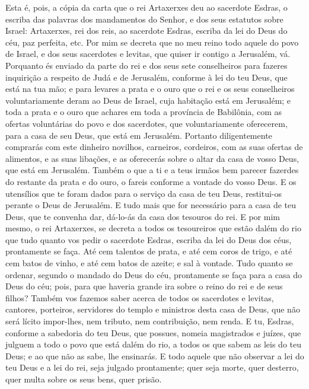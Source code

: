 Esta é, pois, a cópia da carta que o rei Artaxerxes deu ao
sacerdote Esdras, o escriba das palavras dos mandamentos do Senhor,
e dos seus estatutos sobre Israel: Artaxerxes, rei dos reis,
ao sacerdote Esdras, escriba da lei do Deus do céu, paz perfeita,
etc. Por mim se decreta que no meu reino todo aquele do povo
de Israel, e dos seus sacerdotes e levitas, que quiser ir contigo a
Jerusalém, vá. Porquanto és enviado da parte do rei e dos
seus sete conselheiros para fazeres inquirição a respeito de Judá e
de Jerusalém, conforme à lei do teu Deus, que está na tua mão;
e para levares a prata e o ouro que o rei e os seus
conselheiros voluntariamente deram ao Deus de Israel, cuja habitação
está em Jerusalém; e toda a prata e o ouro que achares em
toda a província de Babilônia, com as ofertas voluntárias do povo e
dos sacerdotes, que voluntariamente oferecerem, para a casa de seu
Deus, que está em Jerusalém. Portanto diligentemente
comprarás com este dinheiro novilhos, carneiros, cordeiros, com as
suas ofertas de alimentos, e as suas libações, e as oferecerás sobre
o altar da casa de vosso Deus, que está em Jerusalém. Também
o que a ti e a teus irmãos bem parecer fazerdes do restante da prata
e do ouro, o fareis conforme a vontade do vosso Deus. E os
utensílios que te foram dados para o serviço da casa de teu Deus,
restitui-os perante o Deus de Jerusalém. E tudo mais que for
necessário para a casa de teu Deus, que te convenha dar, dá-lo-ás da
casa dos tesouros do rei. E por mim mesmo, o rei Artaxerxes,
se decreta a todos os tesoureiros que estão dalém do rio que tudo
quanto vos pedir o sacerdote Esdras, escriba da lei do Deus dos
céus, prontamente se faça. Até cem talentos de prata, e até
cem coros de trigo, e até cem batos de vinho, e até cem batos de
azeite; e sal à vontade. Tudo quanto se ordenar, segundo o
mandado do Deus do céu, prontamente se faça para a casa do Deus do
céu; pois, para que haveria grande ira sobre o reino do rei e de
seus filhos? Também vos fazemos saber acerca de todos os
sacerdotes e levitas, cantores, porteiros, servidores do templo e
ministros desta casa de Deus, que não será lícito impor-lhes, nem
tributo, nem contribuição, nem renda. E tu, Esdras, conforme
a sabedoria do teu Deus, que possues, nomeia magistrados e juízes,
que julguem a todo o povo que está dalém do rio, a todos os que
sabem as leis do teu Deus; e ao que não as sabe, lhe ensinarás.
E todo aquele que não observar a lei do teu Deus e a lei do
rei, seja julgado prontamente; quer seja morte, quer desterro, quer
multa sobre os seus bens, quer prisão.

